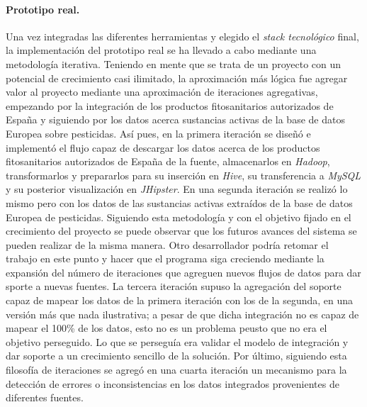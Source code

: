 \paragraph*{Prototipo real.} Una vez integradas las diferentes herramientas y elegido el \textit{stack tecnológico} final, la implementación del prototipo real se ha llevado a cabo mediante una metodología iterativa. Teniendo en mente que se trata de un proyecto con un potencial de crecimiento casi ilimitado, la aproximación más lógica fue agregar valor al proyecto mediante una aproximación de iteraciones agregativas, empezando por la integración de los productos fitosanitarios autorizados de España y siguiendo por los datos acerca sustancias activas de la base de datos Europea sobre pesticidas.  Así pues, en la primera iteración se diseñó e implementó el flujo capaz de descargar los datos acerca de los productos fitosanitarios autorizados de España de la fuente, almacenarlos en \textit{Hadoop}, transformarlos y prepararlos para su inserción en \textit{Hive}, su transferencia a \textit{MySQL} y su posterior visualización en \textit{JHipster}. En una segunda iteración se realizó lo mismo pero con los datos de las sustancias activas extraídos de la base de datos Europea de pesticidas. Siguiendo esta metodología y con el objetivo fijado en el crecimiento del proyecto se puede observar que los futuros avances del sistema se pueden realizar de la misma manera. Otro desarrollador podría retomar el trabajo en este punto y hacer que el programa siga creciendo mediante la expansión del número de iteraciones que agreguen nuevos flujos de datos para dar sporte a nuevas fuentes. La tercera iteración supuso la agregación del soporte capaz de mapear los datos de la primera iteración con los de la segunda, en una versión más que nada ilustrativa; a pesar de que dicha integración no es capaz de mapear el 100\% de los datos, esto no es un problema peusto que no era el objetivo perseguido. Lo que se perseguía era validar el modelo de integración y dar soporte a un crecimiento sencillo de la solución. Por último, siguiendo esta filosofía de iteraciones se agregó en una cuarta iteración un mecanismo para la detección de errores o inconsistencias en los datos integrados provenientes de diferentes fuentes. 


